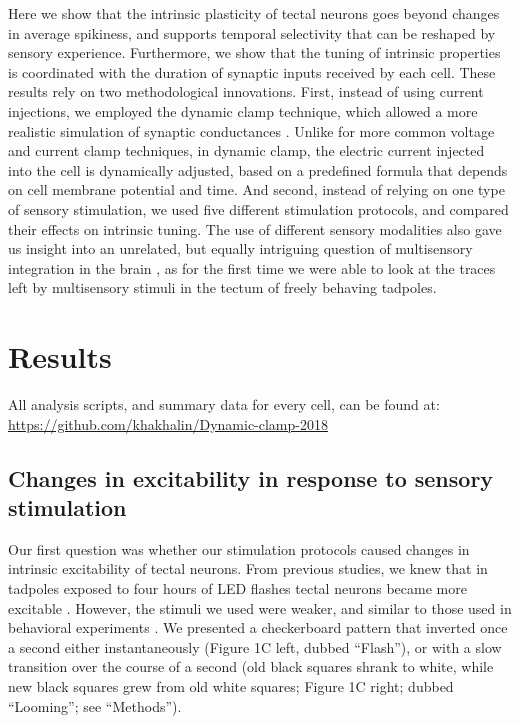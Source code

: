 \documentclass{article}
\begin{document}
Here we show that the intrinsic plasticity of tectal neurons goes beyond changes in average spikiness, and supports temporal selectivity that can be reshaped by sensory experience. Furthermore, we show that the tuning of intrinsic properties is coordinated with the duration of synaptic inputs received by each cell. These results rely on two methodological innovations. First, instead of using current injections, we employed the dynamic clamp technique, which allowed a more realistic simulation of synaptic conductances \citep{prinz2004}. Unlike for more common voltage and current clamp techniques, in dynamic clamp, the electric current injected into the cell is dynamically adjusted, based on a predefined formula that depends on cell membrane potential and time. And second, instead of relying on one type of sensory stimulation, we used five different stimulation protocols, and compared their effects on intrinsic tuning. The use of different sensory modalities also gave us insight into an unrelated, but equally intriguing question of multisensory integration in the brain \citep{deeg2009,felch2016,truszkowski2017}, as for the first time we were able to look at the traces left by multisensory stimuli in the tectum of freely behaving tadpoles.



\section*{Results}

All analysis scripts, and summary data for every cell, can be found at:  \url{https://github.com/khakhalin/Dynamic-clamp-2018}

\subsection*{Changes in excitability in response to sensory stimulation}

Our first question was whether our stimulation protocols caused changes in intrinsic excitability of tectal neurons. From previous studies, we knew that in tadpoles exposed to four hours of LED flashes tectal neurons became more excitable \citep{aizenman2003,ciarleglio2015}. However, the stimuli we used were weaker, and similar to those used in behavioral experiments \citep{khakhalin2014,james2015,truszkowski2017}. We presented a checkerboard pattern that inverted once a second either instantaneously (Figure 1C left, dubbed “Flash”), or with a slow transition over the course of a second (old black squares shrank to white, while new black squares grew from old white squares; Figure 1C right; dubbed “Looming”; see “Methods”).
\end{document}
